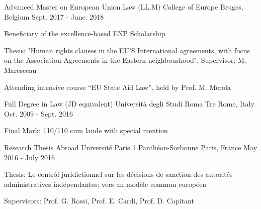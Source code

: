 

\begin{cventries}

  \cventry
    {Advanced Master on European Union Law (LL.M)} %
    {College of Europe} %
    {Bruges, Belgium} %
    {Sept. 2017 - June. 2018} %
    {
      \begin{cvitems} %
              \item {Beneficiary of the excellence-based ENP Scholarship}
                \item {Thesis: "Human rights clauses in the EU'S International agreements, with focus on the Association Agreements in the Eastern neighbourhood". Supervisor: M. Maresceau}
    \item {Attending intensive course “EU State Aid Law”, held by Prof. M. Merola}
      \end{cvitems}
    }
    
   \cventry
    {Full Degree in Law (JD equivalent)} %
    {Università degli Studi Roma Tre} %
    {Rome, Italy} %
    {Oct. 2009 - Sept. 2016} %
    {
      \begin{cvitems} %
        \item {Final Mark: 110/110 cum laude with special mention}
      \end{cvitems}
    }
    
    \cventry
    {Research Thesis Abroad} %
    {Université Paris 1 Panthéon-Sorbonne} %
    {Paris, France} %
    {May 2016 - July 2016} %
    {
      \begin{cvitems} %
        \item {Thesis: Le contrôl juridictionnel sur les décisions de sanction des autorités administratives indépendantes: vers un modèle commun européen}
         \item {Supervisors: Prof. G. Rossi, Prof. E. Cardi, Prof. D. Capitant}
      \end{cvitems}
    }
    

\end{cventries}
